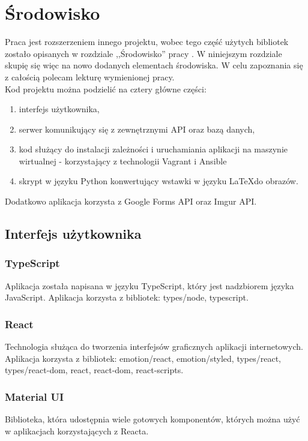 \chapter{Środowisko}
Praca jest rozszerzeniem innego projektu, wobec tego część użytych bibliotek zostało opisanych 
w rozdziale ,,Środowisko'' pracy \ap. W niniejszym rozdziale skupię się więc na nowo dodanych
elementach środowiska. W celu zapoznania się z całością polecam lekturę wymienionej 
pracy.
\\ Kod projektu można podzielić na cztery główne części:
\begin{enumerate}
  \item interfejs użytkownika,
  \item serwer komunikujący się z zewnętrznymi API oraz bazą danych,
  \item kod służący do instalacji zależności i uruchamiania aplikacji na maszynie wirtualnej 
  - korzystający z technologii Vagrant i Ansible
  \item skrypt w języku Python konwertujący wstawki w języku \LaTeX do obrazów.
\end{enumerate}
Dodatkowo aplikacja korzysta z Google Forms API oraz Imgur API.

\section{Interfejs użytkownika}

\subsection{TypeScript}
Aplikacja została napisana w języku TypeScript, który jest nadzbiorem języka JavaScript. 
Aplikacja korzysta z bibliotek: 
types/node, typescript.

\subsection{React}
Technologia służąca do tworzenia interfejsów
graficznych aplikacji internetowych. Aplikacja korzysta z bibliotek:
emotion/react, emotion/styled, types/react, types/react-dom, 
react, react-dom, react-scripts.

\subsection{Material UI}
Biblioteka, która udostępnia wiele gotowych komponentów, których można użyć w
aplikacjach korzystających z Reacta. 

